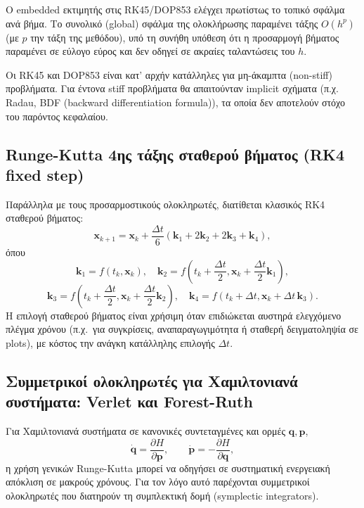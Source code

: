 \documentclass[11pt,a4paper]{report}
\begin{document}
Ο embedded εκτιμητής στις RK45/DOP853 ελέγχει πρωτίστως το τοπικό σφάλμα ανά βήμα.
Το συνολικό (global) σφάλμα της ολοκλήρωσης παραμένει τάξης $O(h^p)$ (με $p$ την τάξη της μεθόδου),
υπό τη συνήθη υπόθεση ότι η προσαρμογή βήματος παραμένει σε εύλογο εύρος και δεν οδηγεί σε ακραίες ταλαντώσεις του $h$.

Οι RK45 και DOP853 είναι κατ' αρχήν κατάλληλες για μη-άκαμπτα (non-stiff) προβλήματα.
Για έντονα stiff προβλήματα θα απαιτούνταν implicit σχήματα (π.χ. Radau, BDF (backward differentiation formula)),
τα οποία δεν αποτελούν στόχο του παρόντος κεφαλαίου.

\subsection{Runge-Kutta 4ης τάξης σταθερού βήματος (RK4 fixed step)}
\label{subsec:rk4-fixed}

Παράλληλα με τους προσαρμοστικούς ολοκληρωτές, διατίθεται κλασικός RK4 σταθερού βήματος:
\begin{equation}
\mathbf{x}_{k+1}=\mathbf{x}_k+\frac{\Delta t}{6}\left(\mathbf{k}_1+2\mathbf{k}_2+2\mathbf{k}_3+\mathbf{k}_4\right),
\end{equation}
όπου
\begin{equation}
\mathbf{k}_1=f(t_k,\mathbf{x}_k),\quad
\mathbf{k}_2=f\!\left(t_k+\frac{\Delta t}{2},\mathbf{x}_k+\frac{\Delta t}{2}\mathbf{k}_1\right),
\end{equation}
\begin{equation}
\mathbf{k}_3=f\!\left(t_k+\frac{\Delta t}{2},\mathbf{x}_k+\frac{\Delta t}{2}\mathbf{k}_2\right),\quad
\mathbf{k}_4=f\!\left(t_k+\Delta t,\mathbf{x}_k+\Delta t\,\mathbf{k}_3\right).
\end{equation}
Η επιλογή σταθερού βήματος είναι χρήσιμη όταν επιδιώκεται αυστηρά ελεγχόμενο
πλέγμα χρόνου (π.χ.\ για συγκρίσεις, αναπαραγωγιμότητα ή σταθερή δειγματοληψία
σε plots), με κόστος την ανάγκη κατάλληλης επιλογής $\Delta t$.

\subsection{Συμμετρικοί ολοκληρωτές για Χαμιλτονιανά συστήματα: Verlet και Forest-Ruth}
\label{subsec:symplectic-solvers}

Για Χαμιλτονιανά συστήματα σε κανονικές συντεταγμένες και ορμές
$\mathbf{q},\mathbf{p}$,
\begin{equation}
\dot{\mathbf{q}}=\frac{\partial H}{\partial \mathbf{p}},\qquad
\dot{\mathbf{p}}=-\frac{\partial H}{\partial \mathbf{q}},
\end{equation}
η χρήση γενικών Runge-Kutta μπορεί να οδηγήσει σε συστηματική ενεργειακή
απόκλιση σε μακρούς χρόνους.
Για τον λόγο αυτό παρέχονται συμμετρικοί ολοκληρωτές που διατηρούν τη
συμπλεκτική δομή (symplectic integrators).
\end{document}
